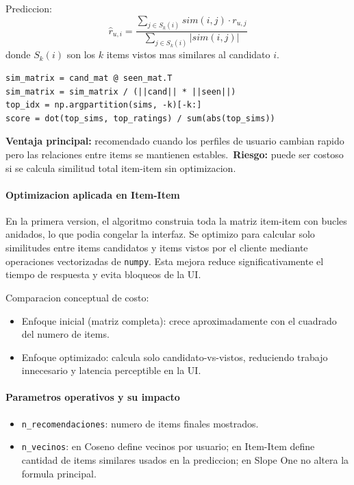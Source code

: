 ﻿\documentclass{article}
\begin{document}
Prediccion:
\[
\hat{r}_{u,i}=\frac{\sum_{j\in S_k(i)} sim(i,j)\cdot r_{u,j}}{\sum_{j\in S_k(i)}|sim(i,j)|}
\]
donde \(S_k(i)\) son los \(k\) items vistos mas similares al candidato \(i\).

\begin{lstlisting}
sim_matrix = cand_mat @ seen_mat.T
sim_matrix = sim_matrix / (||cand|| * ||seen||)
top_idx = np.argpartition(sims, -k)[-k:]
score = dot(top_sims, top_ratings) / sum(abs(top_sims))
\end{lstlisting}

\textbf{Ventaja principal:} recomendado cuando los perfiles de usuario cambian rapido pero las relaciones entre items se mantienen estables.\
\textbf{Riesgo:} puede ser costoso si se calcula similitud total item-item sin optimizacion.

\paragraph{Optimizacion aplicada en Item-Item}
En la primera version, el algoritmo construia toda la matriz item-item con bucles anidados, lo que podia congelar la interfaz. Se optimizo para calcular solo similitudes entre items candidatos y items vistos por el cliente mediante operaciones vectorizadas de \texttt{numpy}. Esta mejora reduce significativamente el tiempo de respuesta y evita bloqueos de la UI.

Comparacion conceptual de costo:
\begin{itemize}
    \item Enfoque inicial (matriz completa): crece aproximadamente con el cuadrado del numero de items.
    \item Enfoque optimizado: calcula solo candidato-vs-vistos, reduciendo trabajo innecesario y latencia perceptible en la UI.
\end{itemize}

\paragraph{Parametros operativos y su impacto}
\begin{itemize}
    \item \texttt{n\_recomendaciones}: numero de items finales mostrados.
    \item \texttt{n\_vecinos}: en Coseno define vecinos por usuario; en Item-Item define cantidad de items similares usados en la prediccion; en Slope One no altera la formula principal.
\end{itemize}
\end{document}
